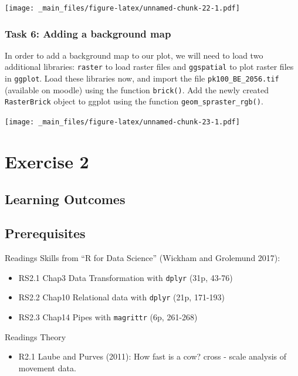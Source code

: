 \documentclass[]{book}
\providecommand{\tightlist}{%
  \setlength{\itemsep}{0pt}\setlength{\parskip}{0pt}}
\theoremstyle{definition}
\theoremstyle{definition}
\theoremstyle{definition}
\theoremstyle{remark}
\begin{document}
\texttt{[image: \_main\_files/figure-latex/unnamed-chunk-22-1.pdf]}

\subsection{Task 6: Adding a background
map}\label{task-6-adding-a-background-map}

In order to add a background map to our plot, we will need to load two
additional libraries: \texttt{raster} to load raster files and
\texttt{ggspatial} to plot raster files in \texttt{ggplot}. Load these
libraries now, and import the file \texttt{pk100\_BE\_2056.tif}
(available on moodle) using the function \texttt{brick()}. Add the newly
created \texttt{RasterBrick} object to ggplot using the function
\texttt{geom\_spraster\_rgb()}.

\texttt{[image: \_main\_files/figure-latex/unnamed-chunk-23-1.pdf]}

\chapter{Exercise 2}\label{exercise-2}

\section{Learning Outcomes}\label{learning-outcomes}

\section{Prerequisites}\label{prerequisites-1}

Readings Skills from ``R for Data Science'' (Wickham and Grolemund
2017):

\begin{itemize}
\tightlist
\item
  RS2.1 Chap3 Data Transformation with \texttt{dplyr} (31p, 43-76)
\item
  RS2.2 Chap10 Relational data with \texttt{dplyr} (21p, 171-193)
\item
  RS2.3 Chap14 Pipes with \texttt{magrittr} (6p, 261-268)
\end{itemize}

Readings Theory

\begin{itemize}
\tightlist
\item
  R2.1 Laube and Purves (2011): How fast is a cow? cross - scale
  analysis of movement data.
\end{itemize}
\end{document}

